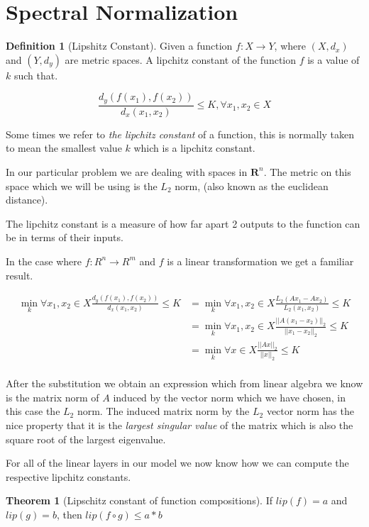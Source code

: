 \documentclass[12pt, a4paper]{report}
\theoremstyle{definition}
\newtheorem{theorem}{Theorem}[section]
\theoremstyle{definition}
\newtheorem{definition}{Definition}[section]
\theoremstyle{definition}
\begin{document}
\section{Spectral Normalization}

\begin{definition}[Lipshitz Constant]
    Given a function $f: X \rightarrow Y$, where $(X, d_x)$ and $(Y, d_y)$ are metric spaces. A lipchitz constant of the function $f$ is a value of $k$ such that.

    $$\frac{d_y(f(x_1), f(x_2))}{d_x(x_1, x_2)} \leq K, \forall x_1, x_2 \in X $$
\end{definition}

Some times we refer to \textit{the lipchitz constant} of a function, this is normally taken to mean the smallest value $k$ which is a lipchitz constant.

In our particular problem we are dealing with spaces in $\mathbf{R}^n$. The metric on this space which we will be using is the $L_2$ norm, (also known as the euclidean distance).

The lipchitz constant is a measure of how far apart 2 outputs to the function can be in terms of their inputs.

In the case where $f: R^n \rightarrow R^m$ and $f$ is a linear transformation we get a familiar result.

\begin{align*}
    \min_k  \forall x_1,x_2 \in X \frac{d_y(f(x_1), f(x_2))}{d_x(x_1, x_2)} \leq K &= \min_k \forall x_1,x_2 \in X \frac{ L_2(Ax_1 - Ax_2)  }{ L_2(x_1, x_2)} \leq K \\
    &=  \min_k \forall x_1,x_2 \in X  \frac{ ||A(x_1 - x_2)||_2  }{ ||x_1- x_2||_2 } \leq K \\
    &=  \min_k \forall x \in X  \frac{ ||Ax||_2  }{ ||x||_2 } \leq K \\
\end{align*}

After the substitution we obtain an expression which from linear algebra we know is the matrix norm of $A$ induced by the vector norm which we have chosen, in this case the $L_2$ norm. The induced matrix norm by the $L_2$ vector norm has the nice property that it is the \textit{largest singular value} of the matrix which is also the square root of the largest eigenvalue.

For all of the linear layers in our model we now know how we can compute the respective lipchitz constants.

\begin{theorem}[Lipschitz constant of function compositions]
    If $lip(f) = a$ and $lip(g) = b$, then $lip(f \circ g) \leq a * b$
\end{theorem}
\end{document}
